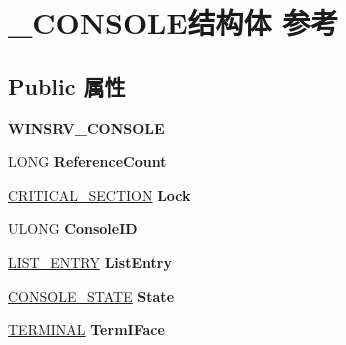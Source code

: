 \hypertarget{struct___c_o_n_s_o_l_e}{}\section{\+\_\+\+C\+O\+N\+S\+O\+L\+E结构体 参考}
\label{struct___c_o_n_s_o_l_e}
\subsection*{Public 属性}
\begin{DoxyCompactItemize}
\item 
\mbox{\label{struct___c_o_n_s_o_l_e_a468dc332addbeea9d0eb0365f2058f58}} 
{\bfseries W\+I\+N\+S\+R\+V\+\_\+\+C\+O\+N\+S\+O\+LE}
\item 
\mbox{\label{struct___c_o_n_s_o_l_e_ac1e96563a86fa5d1d918902738cf321c}} 
L\+O\+NG {\bfseries Reference\+Count}
\item 
\mbox{\label{struct___c_o_n_s_o_l_e_aa9d5be6ea68537723f0c86c7648325b3}} 
\hyperlink{struct___c_r_i_t_i_c_a_l___s_e_c_t_i_o_n}{C\+R\+I\+T\+I\+C\+A\+L\+\_\+\+S\+E\+C\+T\+I\+ON} {\bfseries Lock}
\item 
\mbox{\label{struct___c_o_n_s_o_l_e_a96f34949002899e2e7b3b6e4801f7c93}} 
U\+L\+O\+NG {\bfseries Console\+ID}
\item 
\mbox{\label{struct___c_o_n_s_o_l_e_a12703cb7946e0e7f09be30170ed96aa1}} 
\hyperlink{struct___l_i_s_t___e_n_t_r_y}{L\+I\+S\+T\+\_\+\+E\+N\+T\+RY} {\bfseries List\+Entry}
\item 
\mbox{\label{struct___c_o_n_s_o_l_e_a3033ac223a6378926814b7bfd9b9a675}} 
\hyperlink{struct___c_o_n_s_o_l_e___s_t_a_t_e}{C\+O\+N\+S\+O\+L\+E\+\_\+\+S\+T\+A\+TE} {\bfseries State}
\item 
\mbox{\label{struct___c_o_n_s_o_l_e_a0e80cdcef7e833a237fa05b8bf3d8cb3}} 
\hyperlink{struct___t_e_r_m_i_n_a_l}{T\+E\+R\+M\+I\+N\+AL} {\bfseries Term\+I\+Face}
\item 
\mbox{\label{struct___c_o_n_s_o_l_e_a96ff53c2ea03d802307ef4918dc059ec}} 

\end{DoxyCompactItemize}
